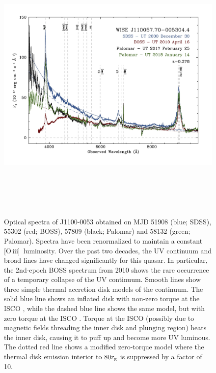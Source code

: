 \documentclass{nature}
\newcommand{\oiii}{[O\,{\sc iii}]\ }
\begin{document}
\begin{figure}
  \centering
  \includegraphics[width=17.00cm, height=14.00cm, trim=0.0cm 0.0cm 0.0cm 0.0cm, clip]
  {../plots/spectra/w1100m0053_sdss_palomar2.jpg}
  \caption[]{Optical spectra of J1100-0053 obtained on MJD 51908
(blue; SDSS), 55302 (red; BOSS), 57809 (black; Palomar) and 58132
(green; Palomar). Spectra have been renormalized to maintain a
constant \oiii luminosity. Over the past two decades, the UV continuum
and broad lines have changed significantly for this quasar.  In
particular, the 2nd-epoch BOSS spectrum from 2010 shows the rare
occurrence of a temporary collapse of the UV continuum.  Smooth lines
show three simple thermal accretion disk models of the continuum.  The
solid blue line shows an inflated disk with non-zero torque at the
ISCO \cite[e.g.,][]{Sirko_Goodman2003}, while the dashed blue line
shows the same model, but with zero torque at the ISCO \cite[i.e.,
equivalent to a simple $\alpha$-disk model,][]{SS73}.  Torque at the
ISCO (possibly due to magnetic fields threading the inner disk and
plunging region) heats the inner disk, causing it to puff up and
become more UV luminous.  The dotted red line shows a modified
zero-torque model where the thermal disk emission interior to $80
r_{\rm g}$ is suppressed by a factor of 10.}
  \label{fig:J110057_spectra}
\end{figure}
\end{document}
